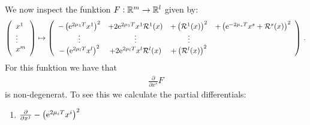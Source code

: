 \begin{remark}
We now inspect the funktion $F:\mathbb{R}^m\to \mathbb{R}^l$ given by:
\begin{equation*}
	\left(\begin{array}{l}
		x^1\\ \vdots \\x^m
	\end{array}\right) \mapsto	\left(\begin{array}{cccc}
		-\left(\mathrm{e}^{2\mu_{1}T}x^{1}\right)^2&+2\mathrm{e}^{2\mu_{1}T}x^{1}\mathcal{R}^1(x)&+\left(\mathcal{R}^{1}(x)\right)^2&	+\left(\mathrm{e}^{-2\mu_sT}x^s+\mathcal{R}^s(x)\right)^2\\
		\vdots &\vdots&\vdots&\\ 
		-\left(\mathrm{e}^{2\mu_{l}T}x^{l}\right)^2&+2\mathrm{e}^{2\mu_{l}T}x^{l}\mathcal{R}^l(x)&+\left(\mathcal{R}^{l}(x)\right)^2&\\
	\end{array}\right)\, .
\end{equation*} For this funktion we have that 
\begin{align*}
	\frac{\partial}{\partial x^s}F
\end{align*} is non-degenerat. To see this we calculate the partial differentials:
\begin{enumerate}
	\item $\frac{\partial}{\partial x^j} -\left(\mathrm{e}^{2\mu_{i}T}x^{i}\right)^2$
\end{enumerate}
\end{remark}
 


